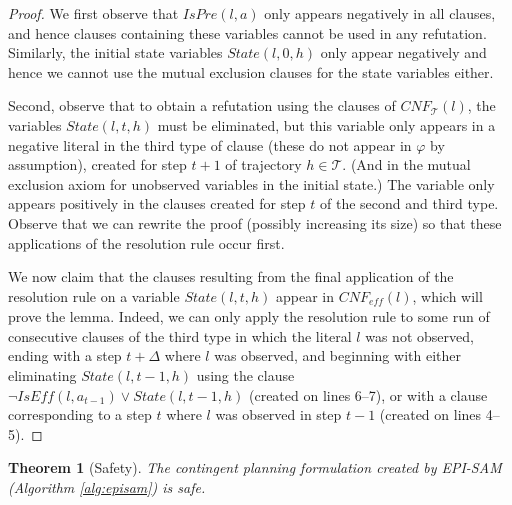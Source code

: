 \documentclass[letterpaper]{article} %
\newtheorem{theorem}{Theorem}
\newcommand{\eff}{\textit{eff}}
\newcommand{\iseff}{\textit{IsEff}}
\newcommand{\ispre}{\textit{IsPre}}
\begin{document}
{\begin{proof}
We first observe that $\ispre(l,a)$ only appears negatively in all clauses, and hence clauses containing these variables cannot be used in any refutation. Similarly, the initial state variables $State(l,0,h)$ only appear negatively and hence we cannot use the mutual exclusion clauses for the state variables either.

Second, observe that to obtain a refutation using the clauses of $CNF_{\mathcal{T}}(l)$, the variables $State(l,t,h)$ must be eliminated, but this variable only appears in a negative literal in the third type of clause (these do not appear in $\varphi$ by assumption), created for step $t+1$ of trajectory $h\in\mathcal{T}$. (And in the mutual exclusion axiom for unobserved variables in the initial state.) The variable only appears positively in the clauses created for step $t$ of the second and third type. Observe that we can rewrite the proof (possibly increasing its size) so that these applications of the resolution rule occur first.

We now claim that the clauses resulting from the final application of the resolution rule on a variable $State(l,t,h)$ appear in $CNF_{\eff}(l)$, which will prove the lemma. Indeed, we can only apply the resolution rule to some run of consecutive clauses of the third type in which the literal $l$ was not observed, ending with a step $t+\Delta$ where $l$ was observed, and beginning with either eliminating $State(l,t-1,h)$ using the clause $\neg \iseff(l,a_{t-1})\vee State(l,t-1,h)$ (created on lines 6--7), or with a clause corresponding to a step $t$ where $l$ was observed in step $t-1$ (created on lines 4--5). 
\end{proof}
}\fi
\begin{theorem}[Safety]\label{thm:episam-safe}
The contingent planning formulation created by EPI-SAM (Algorithm \ref{alg:episam}) is safe.
\end{theorem}
\end{document}
